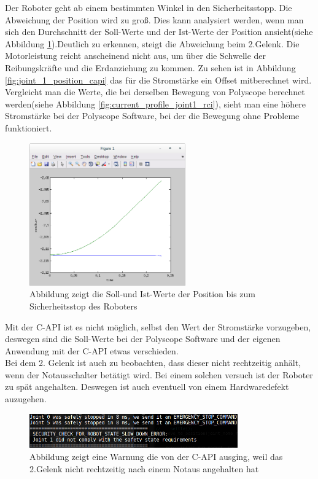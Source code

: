 Der Roboter geht ab einem bestimmten Winkel in den Sicherheitsstopp. Die Abweichung der Position wird zu groß. Dies kann analysiert werden, wenn man sich den Durchschnitt der Soll-Werte und der Ist-Werte der Position ansieht(siehe Abbildung \ref{fig:position_join1}).Deutlich zu erkennen, steigt die Abweichung beim 2.Gelenk. Die Motorleistung reicht anscheinend nicht aus, um über die Schwelle der Reibungskräfte und die Erdanziehung zu kommen. Zu sehen ist in Abbildung \ref{fig:joint_1_position_capi} das für die Stromstärke ein Offset mitberechnet wird. Vergleicht man die Werte, die bei derselben Bewegung von Polyscope berechnet werden(siehe Abbildung \ref{fig:current_profile_joint1_rci}), sieht man eine höhere Stromstärke bei der Polyscope Software, bei der die Bewegung ohne Probleme funktioniert.
\\
\begin{figure}[H]
  \centering
    \includegraphics[width=0.6\textwidth]{pic/joint1_position_capi.png}
      \caption[Soll-und Ist-Werte der Position]{Abbildung zeigt die Soll-und Ist-Werte der Position bis zum Sicherheitsstop des Roboters}
      \label{fig:position_join1}
\end{figure}

Mit der C-\ac{API} ist es nicht möglich, selbst den Wert der Stromstärke vorzugeben, deswegen sind die Soll-Werte bei der Polyscope Software und der eigenen Anwendung mit der C-API etwas verschieden.
\\
Bei dem 2. Gelenk ist auch zu beobachten, dass dieser nicht rechtzeitig anhält, wenn der Notausschalter betätigt wird. Bei einem solchen versuch ist der Roboter zu spät angehalten. Deswegen ist auch eventuell von einem Hardwaredefekt auzugehen.

\begin{figure}[H]
  \centering
    \includegraphics[width=0.8\textwidth]{pic/emergency_stop_capi.png}
      \caption[Warnungsausgabe für 2.Gelenk nach Notausschalter]{Abbildung zeigt eine Warnung die von der C-\ac{API} ausging, weil das 2.Gelenk nicht rechtzeitig nach einem Notaus angehalten hat}
      \label{fig:acceleration_ptp_profile}
\end{figure}


